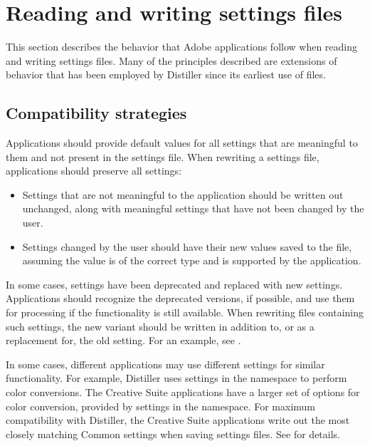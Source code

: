 \documentclass[letterpaper,12pt,english,openany,oneside]{sphinxmanual}
\begin{document}
\section{Reading and writing settings files}
\label{\detokenize{index:reading-and-writing-settings-files}}
This section describes the behavior that Adobe applications follow when reading and writing settings files. Many of the principles described are extensions of behavior that has been employed by Distiller since its earliest use of  files.


\subsection{Compatibility strategies}
\label{\detokenize{index:compatibility-strategies}}
Applications should provide default values for all settings that are meaningful to them and not present in the settings file. When rewriting a settings file, applications should preserve all settings:
\begin{itemize}
\item {} 
Settings that are not meaningful to the application should be written out unchanged, along with meaningful settings that have not been changed by the user.

\item {} 
Settings changed by the user should have their new values saved to the file, assuming the value is of the correct type and is supported by the application.

\end{itemize}

In some cases, settings have been deprecated and replaced with new settings. Applications should recognize the deprecated versions, if possible, and use them for processing if the functionality is still available. When re\sphinxhyphen{}writing files containing such settings, the new variant should be written in addition to, or as a replacement for, the old setting. For an example, see .

In some cases, different applications may use different settings for similar functionality. For example, Distiller uses settings in the  namespace to perform color conversions. The Creative Suite applications have a larger set of options for color conversion, provided by settings in the  namespace. For maximum compatibility with Distiller, the Creative Suite applications write out the most closely matching Common settings when saving settings files. See  for details.
\end{document}

